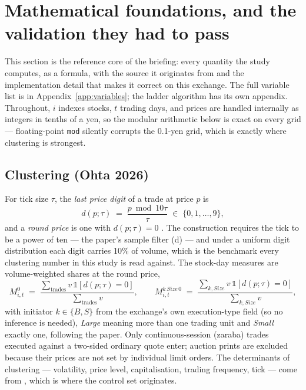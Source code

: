 \section{Mathematical foundations, and the validation they had to pass}
\label{sec:measures}

This section is the reference core of the briefing: every quantity the study
computes, as a formula, with the source it originates from and the
implementation detail that makes it correct on this exchange. The full
variable list is in Appendix~\ref{app:variables}; the ladder algorithm has its
own appendix. Throughout, $i$ indexes stocks, $t$ trading days, and prices are
handled internally as integers in tenths of a yen, so the modular arithmetic
below is exact on every grid --- floating-point \texttt{mod} silently corrupts
the 0.1-yen grid, which is exactly where clustering is strongest.

\subsection{Clustering (Ohta 2026)}

For tick size $\tau$, the \emph{last price digit} of a trade at price $p$ is
%
\begin{equation}
d(p;\tau) \;=\; \frac{p \bmod 10\tau}{\tau} \;\in\; \{0,1,\dots,9\},
\label{eq:digit}
\end{equation}
%
and a \emph{round price} is one with $d(p;\tau)=0$
\parencite{Ohta2026NoiseTraders}. The construction requires the tick to be a
power of ten --- the paper's sample filter (d) --- and under a uniform digit
distribution each digit carries 10\% of volume, which is the benchmark every
clustering number in this study is read against. The stock-day measures are
volume-weighted shares at the round price,
%
\begin{equation}
M^{0}_{i,t} \;=\;
\frac{\sum_{\text{trades}} v \,\mathbb{1}[d(p;\tau)=0]}{\sum_{\text{trades}} v},
\qquad
M^{k\,\mathit{Size}\,0}_{i,t} \;=\;
\frac{\sum_{k,\mathit{Size}} v \,\mathbb{1}[d(p;\tau)=0]}
     {\sum_{k,\mathit{Size}} v},
\label{eq:M}
\end{equation}
%
with initiator $k \in \{B, S\}$ from the exchange's own execution-type field
(so no \textcite{LeeReady1991} inference is needed), \emph{Large} meaning more
than one trading unit and \emph{Small} exactly one, following the paper. Only
continuous-session (zaraba) trades executed against a two-sided ordinary quote
enter; auction prints are excluded because their prices are not set by
individual limit orders. The determinants of clustering --- volatility, price
level, capitalisation, trading frequency, tick --- come from
\textcite{Harris1991Clustering}, which is where the control set originates.

